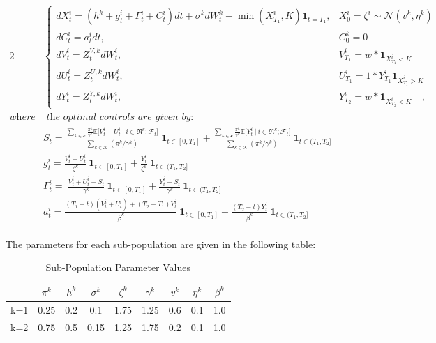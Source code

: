\documentclass[a4paper,10pt]{article}
\newcommand{\1}{\mathbf{1}}
\begin{document}
\begin{alignat}{2}
    &\begin{cases}
        dX_t^{i} =(h^{k}+g_t^{i}+\Gamma_t^{i}+C_t^{i})dt + \sigma^{k}dW_t^{k} - \min\left(X_{T_1}^i,K\right)\mathbf{1}_{t=T_1},  &X_0^{i} = \zeta^{i} \sim \mathcal{N}(v^k,\eta^k)\\
        dC_t^{i} = a_t^{i}dt ,  &C_0^{k}=0 \\ 
        dV_t^{i} = Z_t^{V,k}dW_t^{i},  &V_{T_1}^{i}=w*\mathbf{1}_{X^i_{T_1}<K} \\
        dU_t^{i} = Z_t^{U,k}dW_t^{i},  &U_{T_1}^{i}=1*Y_{T_1}^i\mathbf{1}_{X^i_{T_1}>K}\\
        dY_t^{i} = Z_t^{Y,k}dW_t^{i},  &Y_{T_2}^{i}=w*\mathbf{1}_{X^i_{T_2}<K}\quad,
    \end{cases} \\
    \textit{where} &\textit{ the optimal controls are given by:}\\
    & S_t = \frac{\sum\limits_{k \in \mathcal{k}} {\frac{\pi^k}{\gamma^k}\mathbb{E}\big[ V_t^i +U_t^i ~|~ i \in \mathfrak{N}^k; \mathcal{F}_t \big]}}{\sum\limits_{k \in \mathcal{K}}{(\pi^k/\gamma^k)}} 
            ~\mathbf{1}_{t\in [0,T_1]} +
            \frac{\sum\limits_{k \in \mathcal{k}} {\frac{\pi^k}{\gamma^k}\mathbb{E}\big[ Y_t^i ~|~ i \in \mathfrak{N}^k; \mathcal{F}_t \big]}}{\sum\limits_{k \in \mathcal{K}}{(\pi^k/\gamma^k)}} 
            ~\mathbf{1}_{t\in (T_1,T_2]} \\
    & g_t^{i} = \frac{V_t^{i}+U_t^{i}}{\zeta^{k}} ~\mathbf{1}_{t\in [0,T_1]}
                + \frac{Y_t^{i}}{\zeta^{k}} ~\mathbf{1}_{t\in (T_1,T_2]} \\
    & \Gamma_t^{i} =\  \frac{V_t^{i}+U_t^{i}-S_t}{\gamma^{k}} ~\mathbf{1}_{t\in [0,T_1]}
                    + \frac{Y_t^{i}-S_t}{\gamma^{k}} ~\mathbf{1}_{t\in (T_1,T_2]} \\
    & a_t^{i} =\frac{(T_1-t)(V_t^{i}+U_t^{i})+(T_2-T_1)Y^i_t}{\beta^{k}} ~\mathbf{1}_{t\in [0,T_1]}
                + \frac{(T_2-t)Y_t^{i}}{\beta^{k}} ~\mathbf{1}_{t\in (T_1,T_2]} \\
\end{alignat}

The parameters for each sub-population are given in the following table:

\begin{table}[ht]
    \centering
    \begin{tabular}{*{9}{c}}
        \toprule
        \, & $\pi^k$ & $h^k$ & $\sigma^k$ & $\zeta^k$ & $\gamma^k$ & $v^k$ & $\eta^k$ & $\beta^k$ \\
        \midrule
        k=1 & 0.25 & 0.2 & 0.1  & 1.75 & 1.25 & 0.6 & 0.1 & 1.0 \\
        k=2 & 0.75 & 0.5 & 0.15 & 1.25 & 1.75 & 0.2 & 0.1 & 1.0 \\
        \toprule
    \end{tabular}
    \caption{Sub-Population Parameter Values}
    \label{tab:Params}
\end{table}
\end{document}
